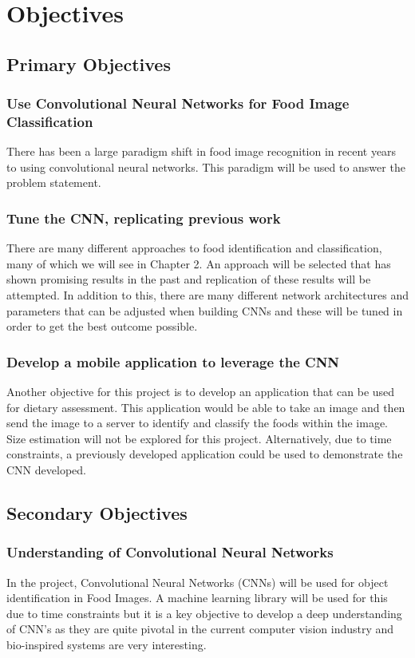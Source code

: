 \section{Objectives}
\subsection*{Primary Objectives}
\subsubsection*{Use Convolutional Neural Networks for Food Image Classification}
There has been a large paradigm shift in food image recognition in recent years to using convolutional neural networks. This paradigm will be used to answer the problem statement.

\subsubsection*{Tune the CNN, replicating previous work}
There are many different approaches to food identification and classification,
many of which we will see in Chapter 2. An approach will be selected that has
shown promising results in the past and replication of these results will be attempted. In addition to this, there are many different network architectures and parameters that can be adjusted when building CNNs and these will be tuned in order to get the best outcome possible.

\subsubsection*{Develop a mobile application to leverage the CNN}
Another objective for this project is to develop an application that can be used
for dietary assessment. This application would be able to take an image and then send the image to a server to identify and classify the foods within the image. Size estimation will not be explored for this project. Alternatively, due to time constraints, a previously developed application could be used to demonstrate the CNN developed.

\subsection*{Secondary Objectives}
\subsubsection*{Understanding of Convolutional Neural Networks}
In the project, Convolutional Neural Networks (CNNs) will be used for object identification in Food Images.
A machine learning library will be used for this due to time constraints but it is a key
objective to develop a deep understanding of CNN's as they are quite pivotal in the current computer vision industry and bio-inspired systems are very interesting.

